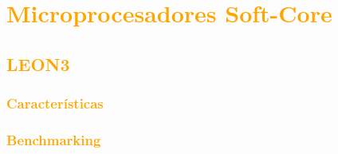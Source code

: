 \documentclass[a4paper,11pt]{article}
\begin{document}





	\section{\textcolor{orange}{Microprocesadores Soft-Core}}
	\subsection{\textcolor{orange}{LEON3}}
		\subsubsection{\textcolor{orange}{Características}}
		\subsubsection{\textcolor{orange}{Benchmarking}}
\end{document}
